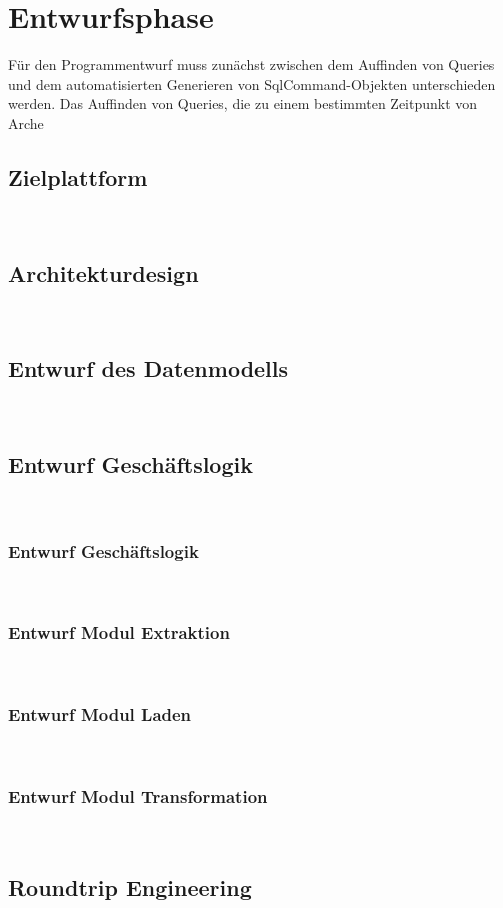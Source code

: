 \documentclass[11pt,toc=sectionentrywithoutdots, 
headheight=44pt, headings=optiontoheadandtoc, hyperfootnotes=false, hypertexnames=false]{scrartcl}
\begin{document}
\section{Entwurfsphase}
Für den Programmentwurf muss zunächst zwischen dem Auffinden von Queries und dem automatisierten Generieren von \gls{SqlCommand}-Objekten unterschieden werden. Das Auffinden von Queries, die zu einem bestimmten Zeitpunkt von Arche

\subsection{Zielplattform}
\blindtext\

\subsection{Architekturdesign}
\blindtext\

\subsection{Entwurf des Datenmodells}
\blindtext\

\subsection{Entwurf Geschäftslogik}
\blindtext\

\subsubsection{Entwurf Geschäftslogik}
\blindtext\

\subsubsection{Entwurf Modul Extraktion}
\blindtext\

\subsubsection{Entwurf Modul Laden}
\blindtext\

\subsubsection{Entwurf Modul Transformation}
\blindtext\

\subsection{Roundtrip Engineering}
\blindtext\
\end{document}
